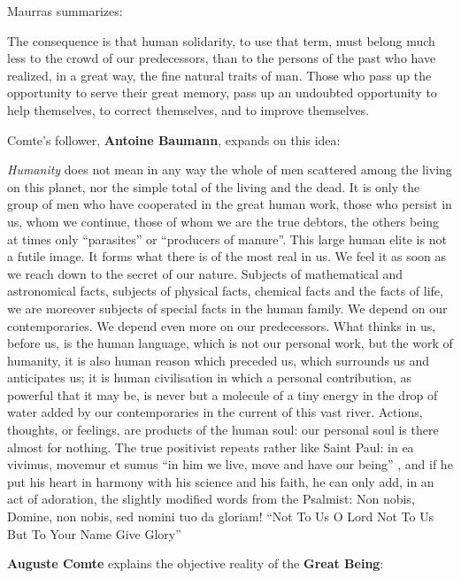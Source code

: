 Maurras summarizes:

\begin{quotex}
The consequence is that human solidarity, to use that term, must belong much less to the crowd of our predecessors, than to the persons of the past who have realized, in a great way, the fine natural traits of man. Those who pass up the opportunity to serve their great memory, pass up an undoubted opportunity to help themselves, to correct themselves, and to improve themselves.
\end{quotex}


Comte's follower, \textbf{Antoine Baumann}, expands on this idea:

\begin{quotex}
\emph{Humanity} does not mean in any way the whole of men scattered among the living on this planet, nor the simple total of the living and the dead. It is only the group of men who have cooperated in the great human work, those who persist in us, whom we continue, those of whom we are the true debtors, the others being at times only ``parasites'' or ``producers of manure''. This large human elite is not a futile image. It forms what there is of the most real in us. We feel it as soon as we reach down to the secret of our nature. Subjects of mathematical and astronomical facts, subjects of physical facts, chemical facts and the facts of life, we are moreover subjects of special facts in the human family. We depend on our contemporaries. We depend even more on our predecessors. What thinks in us, before us, is the human language, which is not our personal work, but the work of humanity, it is also human reason which preceded us, which surrounds us and anticipates us; it is human civilisation in which a personal contribution, as powerful that it may be, is never but a molecule of a tiny energy in the drop of water added by our contemporaries in the current of this vast river. Actions, thoughts, or feelings, are products of the human soul: our personal soul is there almost for nothing. The true positivist repeats rather like Saint Paul: in ea vivimus, movemur et sumus ``in him we live, move and have our being'' , and if he put his heart in harmony with his science and his faith, he can only add, in an act of adoration, the slightly modified words from the Psalmist: Non nobis, Domine, non nobis, sed nomini tuo da gloriam! ``Not To Us O Lord Not To Us But To Your Name Give Glory'' 
\end{quotex}


\textbf{Auguste Comte} explains the objective reality of the \textbf{Great Being}:


